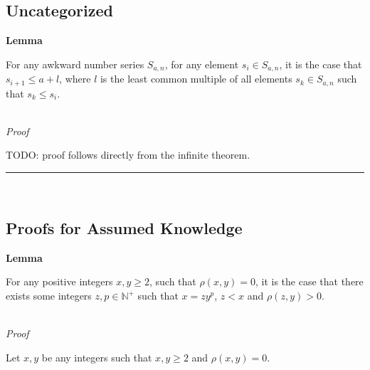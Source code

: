 \documentclass[a4paper,12pt]{article}
\begin{document}
\subsection{Uncategorized}
\label{subsection:uncategorized}

\label{lemma:max_difference_of_elements}
\hypertarget{lemma:max_difference_of_elements}{}
\begin{tcolorbox}
\textbf{Lemma}

For any awkward number series $S_{a, n}$, for any element $s_i \in S_{a, n}$, it is the case that $s_{i + 1} \leq a + l$, where $l$ is the least common multiple of all elements $s_k \in S_{a, n}$ such that $s_k \leq s_i$.

\end{tcolorbox}

\noindent \\
\textit{Proof}

\noindent TODO: proof follows directly from the infinite theorem.


\begin{center}
\noindent\rule{8cm}{0.4pt}
\end{center}
\noindent \\









\subsection{Proofs for Assumed Knowledge}
\label{subsection:assumed_knowledge_proofs}





\begin{tcolorbox}
\textbf{Lemma}

\noindent For any positive integers $x, y \geq 2$, such that $\rho(x,y) = 0$, it is the case that there exists some integers $z, p \in \mathbb{N}^+$ such that $x = zy^p$, $z < x$ and $\rho(z, y) > 0$.\\

\end{tcolorbox}


\noindent \\
\textit{Proof}
\label{proof:remainder_powers}
\hypertarget{proof:remainder_powers}{}

\noindent Let $x, y$ be any integers such that $x, y \geq 2$ and $\rho(x, y) = 0$.\\
\end{document}
